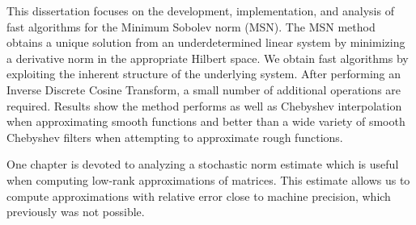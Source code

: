 This dissertation focuses on the development, implementation, and analysis
of fast algorithms for the Minimum Sobolev norm (MSN).
The MSN method obtains a unique solution from
an underdetermined linear system by minimizing
a derivative norm in the appropriate Hilbert space.
We obtain fast algorithms by exploiting the inherent
structure of the underlying system.
After performing an Inverse Discrete Cosine Transform,
a small number of additional operations are required.
Results show the method performs as well as Chebyshev interpolation
when approximating smooth functions
and better than a wide variety of smooth Chebyshev filters
when attempting to approximate rough functions.

One chapter is devoted to analyzing a stochastic norm
estimate which is useful when computing low-rank approximations of matrices.
This estimate allows us to compute approximations with
relative error close to machine precision, which previously was not possible.

